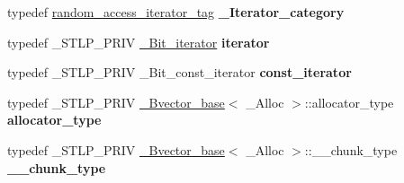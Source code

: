 \begin{DoxyCompactItemize}
typedef \hyperlink{structrandom__access__iterator__tag}{random\+\_\+access\+\_\+iterator\+\_\+tag} {\bfseries \+\_\+\+Iterator\+\_\+category}
\item 
\mbox{\label{class_____b_v_e_c_t_o_r___q_u_a_l_i_f_i_e_d_ac582626f3b0f5a99fa994570805fa141}} 
typedef \+\_\+\+S\+T\+L\+P\+\_\+\+P\+R\+IV \hyperlink{struct___bit__iter}{\+\_\+\+Bit\+\_\+iterator} {\bfseries iterator}
\item 
\mbox{\label{class_____b_v_e_c_t_o_r___q_u_a_l_i_f_i_e_d_a513252d8352c175a220e3eca020bf2ca}} 
typedef \+\_\+\+S\+T\+L\+P\+\_\+\+P\+R\+IV \+\_\+\+Bit\+\_\+const\+\_\+iterator {\bfseries const\+\_\+iterator}
\item 
\mbox{\label{class_____b_v_e_c_t_o_r___q_u_a_l_i_f_i_e_d_a592a7284a6a6cb554900e03fb9837e78}} 
typedef \+\_\+\+S\+T\+L\+P\+\_\+\+P\+R\+IV \hyperlink{class___bvector__base}{\+\_\+\+Bvector\+\_\+base}$<$ \+\_\+\+Alloc $>$\+::allocator\+\_\+type {\bfseries allocator\+\_\+type}
\item 
\mbox{\label{class_____b_v_e_c_t_o_r___q_u_a_l_i_f_i_e_d_a0a1f8852b7120d7be1a06ac17d0c07b1}} 
typedef \+\_\+\+S\+T\+L\+P\+\_\+\+P\+R\+IV \hyperlink{class___bvector__base}{\+\_\+\+Bvector\+\_\+base}$<$ \+\_\+\+Alloc $>$\+::\+\_\+\+\_\+chunk\+\_\+type {\bfseries \+\_\+\+\_\+chunk\+\_\+type}
\end{DoxyCompactItemize}
